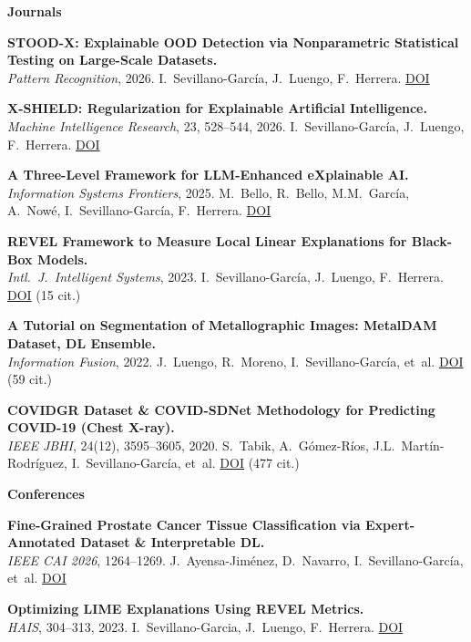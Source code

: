 \documentclass[10pt,a4paper]{article}
\newcommand{\blueitem}[1]{\textcolor{subtitleblue}{\textbf{#1}}}
\newcommand{\sub}[1]{\textcolor{subtle}{\footnotesize #1}}
\begin{document}
\footnotesize

\blueitem{Journals}

\textbf{STOOD-X: Explainable OOD Detection via Nonparametric Statistical Testing on Large-Scale Datasets.} \\
\sub{\textit{Pattern Recognition}, 2026. I.~Sevillano-García, J.~Luengo, F.~Herrera. \href{https://doi.org/10.1016/j.patcog.2026.113254}{DOI}}

\textbf{X-SHIELD: Regularization for Explainable Artificial Intelligence.} \\
\sub{\textit{Machine Intelligence Research}, 23, 528--544, 2026. I.~Sevillano-García, J.~Luengo, F.~Herrera. \href{https://doi.org/10.1007/s11633-025-1576-y}{DOI}}

\textbf{A Three-Level Framework for LLM-Enhanced eXplainable AI.} \\
\sub{\textit{Information Systems Frontiers}, 2025. M.~Bello, R.~Bello, M.M.~García, A.~Nowé, I.~Sevillano-García, F.~Herrera. \href{https://doi.org/10.1007/s10796-025-10668-1}{DOI}}

\textbf{REVEL Framework to Measure Local Linear Explanations for Black-Box Models.} \\
\sub{\textit{Intl.~J.~Intelligent Systems}, 2023. I.~Sevillano-García, J.~Luengo, F.~Herrera. \href{https://doi.org/10.1155/2023/8068569}{DOI} \quad (15 cit.)}

\textbf{A Tutorial on Segmentation of Metallographic Images: MetalDAM Dataset, DL Ensemble.} \\
\sub{\textit{Information Fusion}, 2022. J.~Luengo, R.~Moreno, I.~Sevillano-García, et~al. \href{https://doi.org/10.1016/j.inffus.2021.09.018}{DOI} \quad (59 cit.)}

\textbf{COVIDGR Dataset \& COVID-SDNet Methodology for Predicting COVID-19 (Chest X-ray).} \\
\sub{\textit{IEEE JBHI}, 24(12), 3595--3605, 2020. S.~Tabik, A.~Gómez-Ríos, J.L.~Martín-Rodríguez, I.~Sevillano-García, et~al. \href{https://doi.org/10.1109/JBHI.2020.3037127}{DOI} \quad (477 cit.)}

\blueitem{Conferences}

\textbf{Fine-Grained Prostate Cancer Tissue Classification via Expert-Annotated Dataset \& Interpretable DL.} \\
\sub{\textit{IEEE CAI 2026}, 1264--1269. J.~Ayensa-Jiménez, D.~Navarro, I.~Sevillano-García, et~al. \href{https://doi.org/10.1109/CAI68641.2026.11536250}{DOI}}

\textbf{Optimizing LIME Explanations Using REVEL Metrics.} \\
\sub{\textit{HAIS}, 304--313, 2023. I.~Sevillano-Garcia, J.~Luengo, F.~Herrera. \href{https://doi.org/10.1007/978-3-031-40725-3_26}{DOI}}
\end{document}
